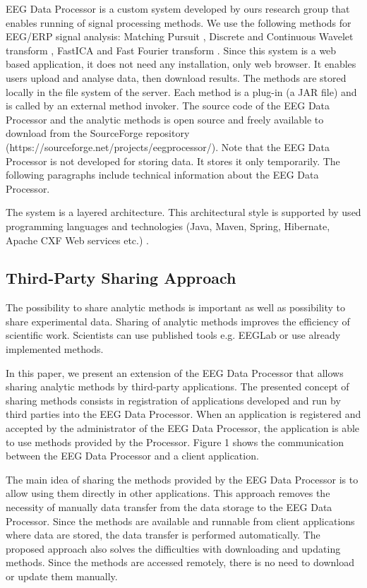 \documentclass{frontiersSCNS} %
\begin{document}
EEG Data Processor \cite{Jezek13} is a custom system developed by ours research group that enables running of signal processing methods. We use the following methods for EEG/ERP signal analysis: Matching Pursuit \cite{Vareka12}, Discrete and Continuous Wavelet transform \cite{Ciniburk10}, FastICA \cite{Hyv01} and Fast Fourier transform \cite{FFT}. Since this system is a web based application, it does not need any installation, only web browser. It enables users upload and analyse data, then download results. The methods are stored locally in the file system of the server. Each method is a plug-in (a JAR file) and is called by an external method invoker. The source code of the EEG Data Processor and the analytic methods is open source and freely available to download from the SourceForge repository (https://sourceforge.net/projects/eegprocessor/). Note that the EEG Data Processor is not developed for storing data. It stores it only temporarily. The following paragraphs include technical information about the EEG Data Processor.

The system is a layered architecture. This architectural style is supported by used programming languages and technologies (Java, Maven, Spring, Hibernate, Apache CXF Web services etc.) \cite{Jezek13}.

\subsection{Third-Party Sharing Approach}

The possibility to share analytic methods is important as well as possibility to share experimental data. Sharing of analytic methods improves the efficiency of scientific work. Scientists can use published tools e.g. EEGLab or use already implemented methods.

In this paper, we present an extension of the EEG Data Processor that allows sharing analytic methods by third-party applications.
The presented concept of sharing methods consists in registration of applications developed and run by third parties into the EEG Data Processor. When an application is registered and accepted by the administrator of the EEG Data Processor, the application is able to use methods provided by the Processor. Figure 1 shows the communication between the EEG Data Processor and a client application.

The main idea of sharing the methods provided by the EEG Data Processor is to allow using them directly in other applications. This approach removes the necessity of manually data transfer from the data storage to the EEG Data Processor. Since the methods are available and runnable from client applications where data are stored, the data transfer is performed automatically. The proposed approach also solves the difficulties with downloading and updating methods. Since the methods are accessed remotely, there is no need to download or update them manually.
\end{document}
